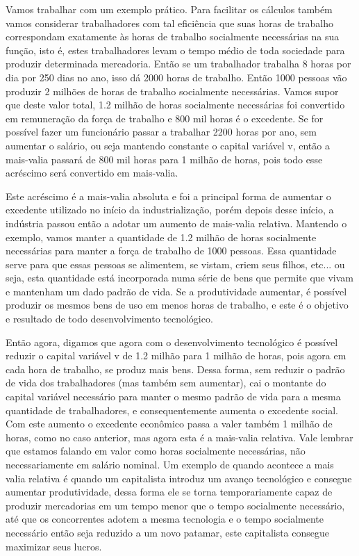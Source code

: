Vamos trabalhar com um exemplo prático. Para facilitar os cálculos também vamos considerar trabalhadores com tal eficiência que suas horas de trabalho correspondam exatamente às horas de trabalho socialmente necessárias na sua função, isto é, estes trabalhadores levam o tempo médio de toda sociedade para produzir determinada mercadoria. Então se um trabalhador trabalha 8 horas por dia por 250 dias no ano, isso dá 2000 horas de trabalho. Então 1000 pessoas vão produzir 2 milhões de horas de trabalho socialmente necessárias.  Vamos supor que deste valor total, 1.2 milhão de horas socialmente necessárias foi convertido em remuneração da força de trabalho  e 800 mil horas é o excedente. Se for possível fazer um funcionário passar a trabalhar 2200 horas por ano, sem aumentar o salário, ou seja mantendo constante o capital variável v, então a mais-valia passará de 800 mil horas para 1 milhão de horas, pois todo esse acréscimo será convertido em mais-valia.  

Este acréscimo é a mais-valia absoluta e foi a principal forma de aumentar o excedente utilizado no início da industrialização, porém depois desse início, a indústria passou então a adotar um aumento de mais-valia relativa. Mantendo o exemplo, vamos manter a quantidade de 1.2 milhão de horas socialmente necessárias para manter a força de trabalho de 1000 pessoas. Essa quantidade serve para que essas pessoas se alimentem, se vistam, criem seus filhos, etc... ou seja, esta quantidade está incorporada numa série de bens que permite que vivam e mantenham um dado padrão de vida. Se a produtividade aumentar, é possível produzir os mesmos bens de uso em menos horas de trabalho, e este é o objetivo e resultado de todo desenvolvimento tecnológico.

Então agora, digamos que agora com o desenvolvimento tecnológico é possível reduzir o capital variável v de 1.2 milhão para 1 milhão de horas, pois agora em cada hora de trabalho, se produz mais bens. Dessa forma, sem reduzir o padrão de vida dos trabalhadores (mas também sem aumentar), cai o montante do capital variável necessário para manter o mesmo padrão de vida para a mesma quantidade de trabalhadores, e consequentemente aumenta o excedente social. Com este aumento o excedente econômico passa a valer também 1 milhão de horas, como no caso anterior, mas agora esta é a mais-valia relativa. Vale lembrar que estamos falando em valor como horas socialmente necessárias, não necessariamente em salário nominal. Um exemplo de quando acontece a mais valia relativa é quando um capitalista introduz um avanço tecnológico e consegue aumentar produtividade, dessa forma ele se torna  temporariamente capaz de produzir mercadorias em um tempo menor que o tempo socialmente necessário, até que os concorrentes adotem a mesma tecnologia e o tempo socialmente necessário então seja reduzido a um novo patamar, este capitalista consegue maximizar seus lucros.

